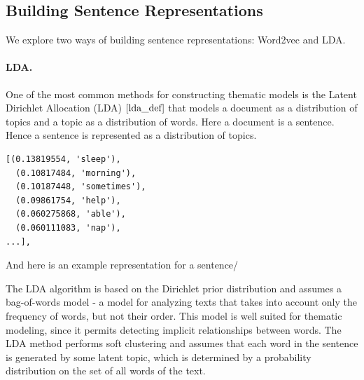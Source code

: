 \documentclass[11pt]{article}
\begin{document}


\subsection{Building Sentence Representations}
\label{subsec:sentencerepresentations}
We explore two ways of building sentence representations: Word2vec and LDA. %


\paragraph{LDA.}

One of the most common methods for constructing thematic models is the Latent Dirichlet Allocation (LDA) $\cite{lda_def}$ that models a document as a distribution of topics and a topic as a distribution of words. Here a document is a sentence. Hence a sentence is represented as a distribution of topics. 

\begin{lstlisting}
[(0.13819554, 'sleep'),
  (0.10817484, 'morning'),
  (0.10187448, 'sometimes'),
  (0.09861754, 'help'),
  (0.060275868, 'able'),
  (0.060111083, 'nap'),
...],
\end{lstlisting}


And here is an example representation for a  sentence/ 



The LDA algorithm is based on the Dirichlet prior distribution and
assumes a bag-of-words model - a model for analyzing texts
that takes into account only the frequency of words, but not their
order. This model is well suited for thematic modeling, since it
permits detecting implicit relationships between words. The LDA
method performs soft clustering and assumes that each word in the
sentence is generated by some latent topic, which is determined by a
probability distribution on the set of all words of the text.
\end{document}
